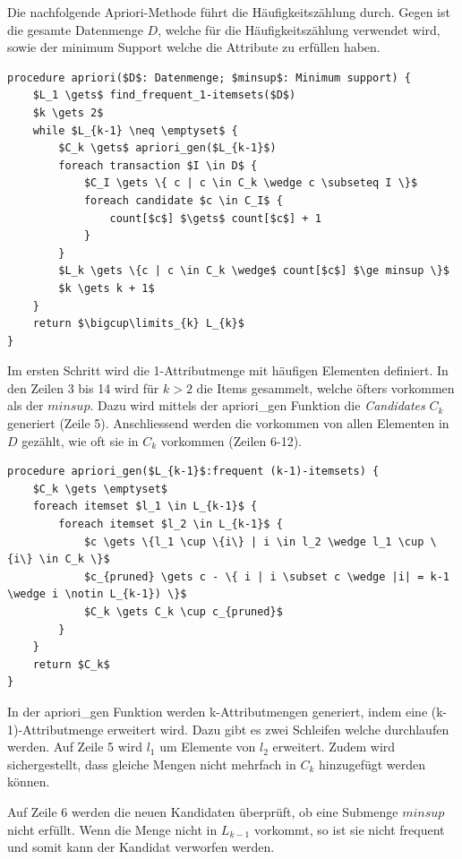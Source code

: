 Die nachfolgende Apriori-Methode führt die Häufigkeitszählung durch.
Gegen ist die gesamte Datenmenge $D$, welche für die Häufigkeitszählung verwendet wird, sowie der minimum Support welche die Attribute zu erfüllen haben.
\begin{lstlisting}
procedure apriori($D$: Datenmenge; $minsup$: Minimum support) {
	$L_1 \gets$ find_frequent_1-itemsets($D$)
	$k \gets 2$
	while $L_{k-1} \neq \emptyset$ {
		$C_k \gets$ apriori_gen($L_{k-1}$)
		foreach transaction $I \in D$ {
			$C_I \gets \{ c | c \in C_k \wedge c \subseteq I \}$
			foreach candidate $c \in C_I$ {
				count[$c$] $\gets$ count[$c$] + 1
			}
		}
		$L_k \gets \{c | c \in C_k \wedge$ count[$c$] $\ge minsup \}$
		$k \gets k + 1$
	}
	return $\bigcup\limits_{k} L_{k}$
}
\end{lstlisting}
Im ersten Schritt wird die 1-Attributmenge mit häufigen Elementen definiert. In den Zeilen 3 bis 14 wird für $k > 2$ die Items gesammelt, welche öfters vorkommen als der $minsup$. Dazu wird mittels der apriori\_gen Funktion die \textit{Candidates} $C_k$ generiert (Zeile 5).
Anschliessend werden die vorkommen von allen Elementen in $D$ gezählt, wie oft sie in $C_k$ vorkommen (Zeilen 6-12).


\begin{lstlisting}
procedure apriori_gen($L_{k-1}$:frequent (k-1)-itemsets) {
	$C_k \gets \emptyset$
	foreach itemset $l_1 \in L_{k-1}$ {
		foreach itemset $l_2 \in L_{k-1}$ {
			$c \gets \{l_1 \cup \{i\} | i \in l_2 \wedge l_1 \cup \{i\} \in C_k \}$
			$c_{pruned} \gets c - \{ i | i \subset c \wedge |i| = k-1 \wedge i \notin L_{k-1}) \}$
			$C_k \gets C_k \cup c_{pruned}$
		}
	}
	return $C_k$
}
\end{lstlisting}
In der apriori\_gen Funktion werden k-Attributmengen generiert, indem eine (k-1)-Attributmenge erweitert wird. Dazu gibt es zwei Schleifen welche durchlaufen werden. Auf Zeile 5 wird $l_1$ um Elemente von $l_2$ erweitert. Zudem wird sichergestellt, dass gleiche Mengen nicht mehrfach in $C_k$ hinzugefügt werden können.

Auf Zeile 6 werden die neuen Kandidaten überprüft, ob eine Submenge $minsup$ nicht erfüllt. Wenn die Menge nicht in $L_{k-1}$ vorkommt, so ist sie nicht frequent und somit kann der Kandidat verworfen werden. 

